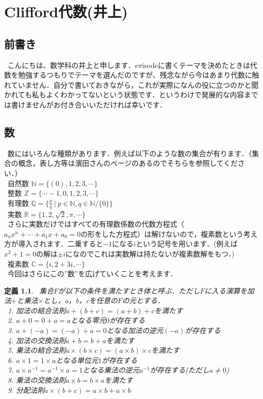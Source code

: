 \documentclass{jreport}
\theoremstyle{idefinition}
\newtheorem{idefi}{定義}[section]
\begin{document}
\chapter{Clifford代数(井上)}

\section{前書き}
\ こんにちは、数学科の井上と申します．e$\pi$isodeに書くテーマを決めたときは代数を勉強するつもりでテーマを選んだのですが、残念ながら今はあまり代数に触れていません．自分で書いておきながら，これが実際になんの役に立つのかと聞かれても私もよくわかってないという状態です．というわけで発展的な内容までは書けませんがお付き合いいただければ幸いです．\\

\section{数}
\ 数にはいろんな種類があります．例えば以下のような数の集合が有ります．（集合の概念，表し方等は濱田さんのページのあるのでそちらを参照してください．）\\
\ 自然数 $\mathbb{N} = \{(0),1,2,3,\cdots \}$\\
\ 整数 $\mathbb{Z} = \{\cdots-1,0,1,2,3,\cdots \}$\\
\ 有理数 $\mathbb{Q} = \{\frac{p}{q}\ |\ p\in \mathbb{N},q\in\mathbb{N}/\{ 0\} \}$\\
\ 実数 $\mathbb{R}=\{1,2,\sqrt{2},\pi,\cdots \}$\\
\ さらに実数だけではすべての有理数係数の代数方程式（$a_nx^n+\cdots +a_1x+a_0=0$の形をした方程式）は解けないので，複素数という考え方が導入されます．二乗すると$-1$になる$i$という記号を用います．(例えば$x^2+1=0$の解は$\pm i$になのでこれは実数解は持たないが複素数解をもつ．)\\
\ 複素数 $\mathbb{C}=\{i ,2+3i ,\cdots \}$\\
\ 今回はさらにこの''数''を広げていくことを考えます．\\

\begin{idefi} 
\ 集合$F$が以下の条件を満たすとき体と呼ぶ．ただし$F$に入る演算を加法$+$と乗法$\times$とし，a，b，cを任意の$F$の元とする．\\
\ 1. 加法の結合法則$a+(b+c)=(a+b)+c$を満たす\\
\ 2. $a+0=0+a=a$となる零元$0$が存在する\\
\ 3. $a+(-a)=(-a)+a=0$となる加法の逆元$(-a)$が存在する\\
\ 4. 加法の交換法則$a+b=b+a$を満たす\\
\ 5. 乗法の結合法則$a\times(b\times c)=(a\times b)\times c$を満たす\\
\ 6. $a\times1=1\times a$となる単位元$1$が存在する\\
\ 7. $a\times a^{-1}=a^{-1} \times a=1$となる乗法の逆元$a^{-1}$が存在する(ただし$a\neq 0$)\\
\ 8. 乗法の交換法則$a\times b=b\times a$を満たす\\
\ 9. 分配法則$a\times(b+c)=a\times b+a \times b$
\end{idefi} 
\end{document}
